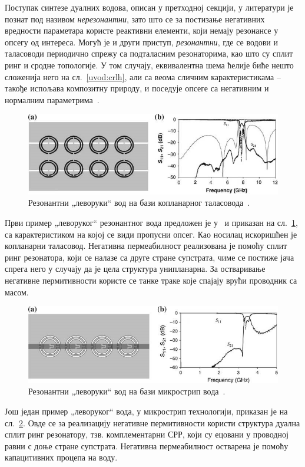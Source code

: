 Поступак синтезе дуалних водова, описан у претходној секцији, у литератури је познат под називом \emph{нерезонантни}, зато што се за постизање негативних вредности параметара користе реактивни елементи, који немају резонансе у опсегу од интереса. Могућ је и други приступ, \emph{резонантни}, где се водови и таласоводи периодично спрежу са подталасним резонаторима, као што су сплит ринг и сродне топологије. У том случају, еквивалентна шема ћелије биће нешто сложенија него на сл.~\ref{uvod:crlh}, али са веома сличним карактеристикама – такође испољава композитну природу, и поседује опсеге са негативним и нормалним параметрима~\cite{markes_knjiga}.

\begin{figure}[h]
    \centering
    \includegraphics[width=1.0\linewidth]{sl_uvod/cpw.jpg}
    \caption{Резонантни „леворуки`` вод на бази копланарног таласовода~\cite{doi:10.1063/1.1631392}.}
    \label{uvod:sl_cpw}
\end{figure}
Први пример „леворуког`` резонантног вода предложен је у~\cite{doi:10.1063/1.1631392} и приказан на сл.~\ref{uvod:sl_cpw}, са карактеристиком на којој се види пропусни опсег. Као носилац искоришћен је копланарни таласовод. Негативна пермеабилност реализована је помоћу сплит ринг резонатора, који се налазе са друге стране супстрата, чиме се постиже јача спрега него у случају да је цела структура унипланарна. За остваривање негативне пермитивности користе се танке траке које спајају врући проводник са масом.


\begin{figure}[h]
    \centering
    \includegraphics[width=1.0\linewidth]{sl_uvod/mstrip_csrr.jpg}
    \caption{Резонантни „леворуки`` вод на бази микрострип вода~\cite{baena}.}
    \label{uvod:sl_mstrip_csrr}
\end{figure}
Још један пример „леворуког`` вода, у микрострип технологији, приказан је на сл.~\ref{uvod:sl_mstrip_csrr}. Овде се за реализацију негативне пермитивности користи структура дуална сплит ринг резонатору, тзв. комплементарни СРР, који су ецовани у проводној равни с доње стране супстрата. Негативна пермеабилност остварена је помоћу капацитивних процепа на воду.

